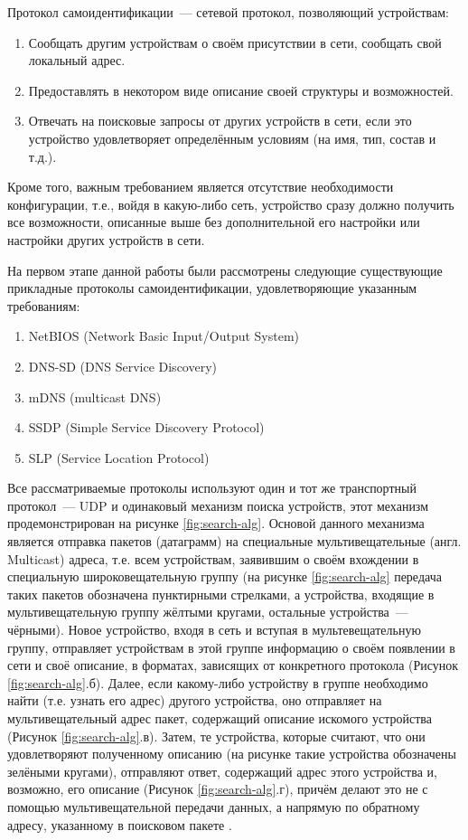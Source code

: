 Протокол самоидентификации~--- сетевой протокол, позволяющий устройствам:
\begin{enumerate}
	\item Сообщать другим устройствам о своём присутствии в сети, сообщать свой локальный адрес.
	\item Предоставлять в некотором виде описание своей структуры и возможностей.
	\item Отвечать на поисковые запросы от других устройств в сети, если это устройство удовлетворяет определённым условиям (на имя, тип, состав и т.д.).
\end{enumerate}

Кроме того, важным требованием является отсутствие необходимости конфигурации, т.е., войдя в какую-либо сеть, устройство сразу должно получить все возможности, описанные выше без дополнительной его настройки или настройки других устройств в сети.

На первом этапе данной работы были рассмотрены следующие существующие прикладные протоколы самоидентификации, удовлетворяющие указанным требованиям:
\begin{enumerate}
	\item NetBIOS (Network Basic Input/Output System)
	\item DNS-SD (DNS Service Discovery)
	\item mDNS (multicast DNS)
	\item SSDP (Simple Service Discovery Protocol)
	\item SLP (Service Location Protocol)
\end{enumerate}

Все рассматриваемые протоколы используют один и тот же транспортный протокол~--- UDP и одинаковый механизм поиска устройств, этот механизм продемонстрирован на рисунке \ref{fig:search-alg}. 
Основой данного механизма является отправка пакетов (датаграмм) на специальные мультивещательные (англ. Multicast) адреса, т.е. всем устройствам, заявившим о своём вхождении в специальную широковещательную группу (на рисунке \ref{fig:search-alg} передача таких пакетов обозначена пунктирными стрелками, а устройства, входящие в мультивещательную группу жёлтыми кругами, остальные устройства~--- чёрными).
Новое устройство, входя в сеть и вступая в мультевещательную группу, отправляет устройствам в этой группе информацию о своём появлении в сети и своё описание, в форматах, зависящих от конкретного протокола (Рисунок \ref{fig:search-alg}.б). 
Далее, если какому-либо устройству в группе необходимо найти (т.е. узнать его адрес) другого устройства, оно отправляет на мультивещательный адрес пакет, содержащий описание искомого устройства (Рисунок \ref{fig:search-alg}.в). 
Затем, те устройства, которые считают, что они удовлетворяют полученному описанию (на рисунке такие устройства обозначены зелёными кругами), отправляют ответ, содержащий адрес этого устройства и, возможно, его описание (Рисунок \ref{fig:search-alg}.г), причём делают это не с помощью мультивещательной передачи данных, а напрямую по обратному адресу, указанному в поисковом пакете \cite{}.


